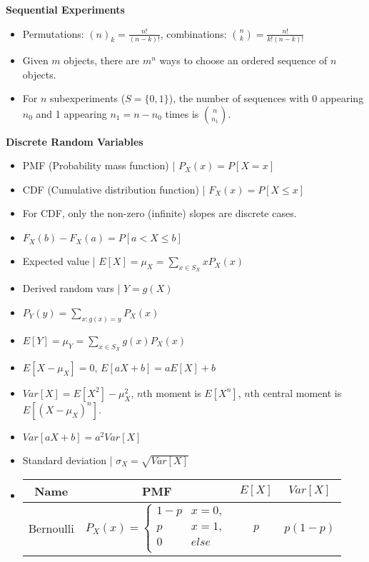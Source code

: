 \documentclass[8pt]{article}
\begin{document}
\textbf{Sequential Experiments}
\begin{itemize}
    \item Permutations: $(n)_k = \frac{n!}{(n - k)!}$, combinations: ${n \choose k} = \frac{n!}{k!(n - k)!}$
    \item Given $m$ objects, there are $m^n$ ways to choose an ordered sequence of $n$ objects.
    \item For $n$ subexperiments ($S = \{ 0, 1 \}$), the number of sequences with 0 appearing $n_0$ and 1 appearing $n_1 = n - n_0$ times is ${n \choose n_1}$.
\end{itemize}
\textbf{Discrete Random Variables}
\begin{itemize}
    \item PMF (Probability mass function) | $P_X(x) = P[X = x]$
    \item CDF (Cumulative distribution function) | $F_X(x) = P[X \leq x]$
    \item For CDF, only the non-zero (infinite) slopes are discrete cases.
    \item $F_X(b) - F_X(a) = P[a < X \leq b]$
    \item Expected value | $E[X] = \mu_X = \sum_{x \in S_X} xP_X(x)$
    \item Derived random vars | $Y = g(X)$
    \item $P_Y(y) = \sum_{x:g(x) = y} P_X(x)$
    \item $E[Y] = \mu_Y = \sum_{x \in S_X} g(x) P_X(x)$
    \item $E[X - \mu_X] = 0$, $E[aX + b] = aE[X] + b$
    \item $Var[X] = E[X^2] - \mu_X^2$, $n$th moment is $E[X^n]$, $n$th central moment is $E[(X - \mu_X)^n]$.
    \item $Var[aX + b] = a^2 Var[X]$
    \item Standard deviation | $\sigma_X = \sqrt{Var[X]}$
    \item
    \begin{tabular}{|c|c|c|c|}
        \hline
        Name & PMF & $E[X]$ & $Var[X]$ \\
        \hline
        Bernoulli & $P_X(x) = \begin{cases}
            1 - p & x = 0, \\
            p & x = 1, \\
            0 & else \\
        \end{cases}$ & $p$ & $p(1 - p)$ \\

\end{tabular}
\end{itemize}
\end{document}

